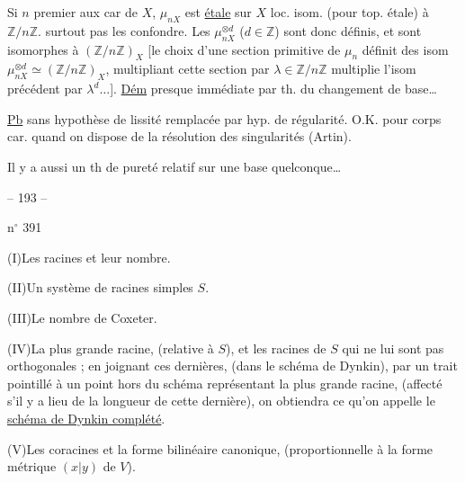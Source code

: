 Si $n$ premier aux car de $X$, $\mu_{nX}$ est \uline{étale} sur $X$
loc. isom. (pour top. étale) à $\mathbb Z/n\mathbb Z$. 
surtout pas les confondre. Les $\mu_{nX}^{\otimes d}$
($d\in\mathbb Z$) sont donc définis, et sont  isomorphes à $(\mathbb Z/n\mathbb Z)_X$
[le choix d'une section primitive de $\mu_n$ définit des isom
$\mu_{nX}^{\otimes d}\simeq(\mathbb Z/n\mathbb Z)_X$, multipliant cette
section par $\lambda\in\mathbb Z/n\mathbb Z$ multiplie l'isom
précédent par $\lambda^d\ldots$].
\uline{Dém} presque immédiate par th. du changement de base\ldots

\uline{Pb} sans hypothèse de lissité remplacée par hyp.
de régularité. O.K. 
pour corps car.  quand on
dispose de la résolution des singularités (Artin).

Il y a aussi un th de pureté relatif sur
une base quelconque\ldots





\begin{center}-- 193 --\end{center}
\hfill n$^{\circ}$ 391

(I)\quad Les racines et leur nombre.

(II)\quad Un système de racines simples $S$.

(III)\quad Le nombre de Coxeter.

(IV)\quad La plus grande racine, (relative à $S$), et les racines de $S$ qui ne lui
sont pas orthogonales ; en joignant ces dernières, (dans le schéma de Dynkin),
par un trait pointillé à un point hors du schéma représentant la plus grande
racine, (affecté s'il y a lieu de la longueur de cette dernière), on obtiendra
ce qu'on appelle le \uline{schéma de Dynkin complété}.

(V)\quad Les coracines et la forme bilinéaire canonique, (proportionnelle à la
forme métrique $(x|y)$ de $V$).

